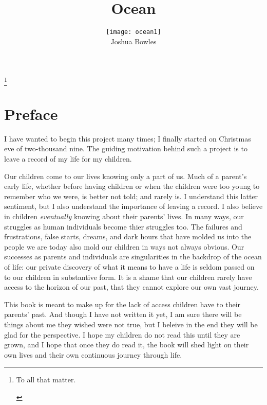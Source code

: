 \documentclass[a4paper,10pt]{book}%
\begin{document}
\frontmatter 
\title{\Huge Ocean}
\author{\texttt{[image: ocean1]}\\ \LARGE Joshua Bowles\\ \date{}}

\maketitle   
\thanks{\begin{center}{To all that matter.}
\end{center}}  
        


\tableofcontents



\chapter*{Preface}
I have wanted to begin this project many times; I finally started on Christmas eve of two-thousand nine. The guiding motivation behind such a project is to leave a record of my life for my children. 

Our children come to our lives knowing only a part of us. Much of a parent's early life, whether before having children or when the children were too young to remember who we were, is better not told; and rarely is. I understand this latter sentiment, but I also understand the importance of leaving a record. I also believe in children \textsl{eventually} knowing about their parents' lives. In many ways, our struggles as human individuals become thier struggles too. The failures and frustrations, false starts, dreams, and dark hours that have molded us into the people we are today also mold our children in ways not always obvious. Our successes as parents and individuals are singularities in the backdrop of the ocean of life: our private discovery of what it means to have a life is seldom passed on to our children in substantive form. It is a shame that our children rarely have access to the horizon of our past, that they cannot explore our own vast journey. 

This book is meant to make up for the lack of access children have to their parents' past. And though I have not written it yet, I am sure there will be things about me they wished were not true, but I beleive in the end they will be glad for the perspective. I hope my children do not read this until they are grown, and I hope that once they do read it, the book will shed light on their own lives and their own continuous journey through life.
\end{document}
